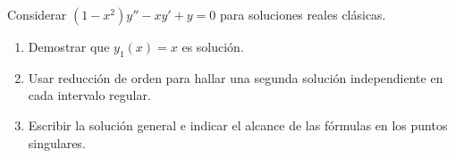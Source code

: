 Considerar \((1-x^2)y''-xy'+y=0\) para soluciones reales clásicas.

\begin{enumerate}[label=(\alph*),ref=\alph*,leftmargin=*]
\item Demostrar que \(y_1(x)=x\) es solución.
\item Usar reducción de orden para hallar una segunda solución independiente en cada intervalo regular.
\item Escribir la solución general e indicar el alcance de las fórmulas en los puntos singulares.
\end{enumerate}

